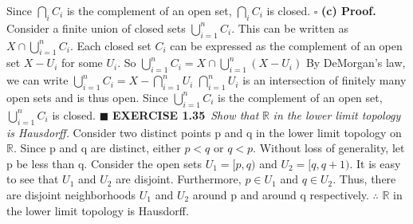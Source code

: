 \documentclass[12pt]{article}
\begin{document}
	Since \(\bigcap_i C_i\) is the complement of an open set, \(\bigcap_i C_i\) is closed.
	\newline \(\square\) \newline \newline
	\textbf{(c) Proof.} \newline
	Consider a finite union of closed sets \(\bigcup_{i=1}^n C_i\).
	\newline
	This can be written as \(X \cap \bigcup_{i=1}^n C_i\).
	\newline \newline
	Each closed set \(C_i\) can be expressed as the complement of an open set \(X - U_i\) for some \(U_i\).
	\newline
	So \(\bigcup_{i=1}^n C_i = X \cap \bigcup_{i=1}^n (X - U_i)\)
	\newline
	By DeMorgan's law, we can write
	\(\bigcup_{i=1}^n C_i = X - \bigcap_{i=1}^n U_i\)
	\newline \newline
	\(\bigcap_{i=1}^n U_i\) is an intersection of finitely many open sets and is thus open. \newline
	Since \(\bigcup_{i=1}^n C_i\) is the complement of an open set, \(\bigcup_{i=1}^n C_i\) is closed.
	\newline \(\blacksquare\)
	\newpage
	\noindent
	\textbf{EXERCISE 1.35}\ \textit{Show that} \(\mathbb{R}\)
	\textit{in the lower limit topology is Hausdorff.}
	\newline \newline
	Consider two distinct points p and q in the lower limit topology on \(\mathbb{R}\). \newline \newline
	Since p and q are distinct, either \(p < q\) or \(q < p\).
	\newline
	Without loss of generality, let p be less than q.
	\newline \newline
	Consider the open sets \(U_1 = [p,q)\) and \(U_2 = [q, q+1)\).
	\newline
	It is easy to see that \(U_1\) and \(U_2\) are disjoint. \newline
	Furthermore, \(p \in U_1\) and \(q \in U_2\).
	\newline \newline
	Thus, there are disjoint neighborhoods \(U_1\) and \(U_2\) around p and around q respectively.
	\newline \newline
	\(\therefore\) \(\mathbb{R}\) in the lower limit topology is Hausdorff.
\end{document}
